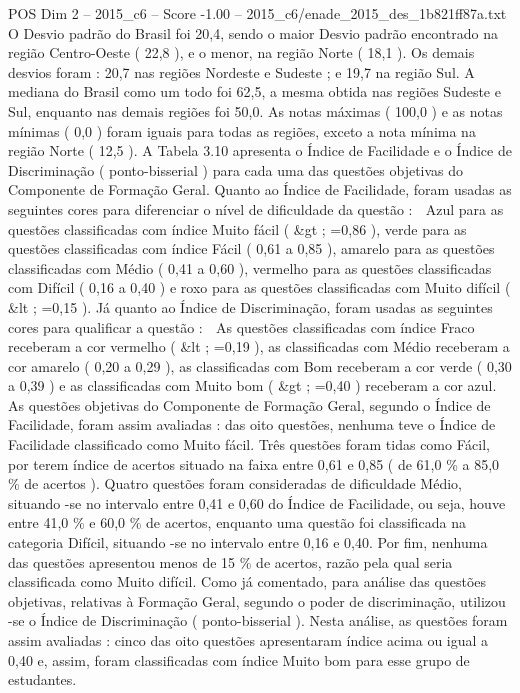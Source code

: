 \begin{textsample}{POS Dim 2 – 2015\_c6 – Score -1.00 – 2015\_c6/enade\_2015\_des\_1b821ff87a.txt}
O Desvio padrão do Brasil foi 20,4, sendo o maior Desvio padrão encontrado na região Centro-Oeste ( 22,8 ), e o menor, na região Norte ( 18,1 ).
Os demais desvios foram : 20,7 nas regiões Nordeste e Sudeste ; e 19,7 na região Sul.
A mediana do Brasil como um todo foi 62,5, a mesma obtida nas regiões Sudeste e Sul, enquanto nas demais regiões foi 50,0.
As notas máximas ( 100,0 ) e as notas mínimas ( 0,0 ) foram iguais para todas as regiões, exceto a nota mínima na região Norte ( 12,5 ).
A Tabela 3.10 apresenta o Índice de Facilidade e o Índice de Discriminação ( ponto-bisserial ) para cada uma das questões objetivas do Componente de Formação Geral.
Quanto ao Índice de Facilidade, foram usadas as seguintes cores para diferenciar o nível de dificuldade da questão :  Azul para as questões classificadas com índice Muito fácil ( \&gt ; =0,86 ), verde para as questões classificadas com índice Fácil ( 0,61 a 0,85 ), amarelo para as questões classificadas com Médio ( 0,41 a 0,60 ), vermelho para as questões classificadas com Difícil ( 0,16 a 0,40 ) e roxo para as questões classificadas com Muito difícil ( \&lt ; =0,15 ).
Já quanto ao Índice de Discriminação, foram usadas as seguintes cores para qualificar a questão :  As questões classificadas com índice Fraco receberam a cor vermelho ( \&lt ; =0,19 ), as classificadas com Médio receberam a cor amarelo ( 0,20 a 0,29 ), as classificadas com Bom receberam a cor verde ( 0,30 a 0,39 ) e as classificadas com Muito bom ( \&gt ; =0,40 ) receberam a cor azul.
As questões objetivas do Componente de Formação Geral, segundo o Índice de Facilidade, foram assim avaliadas : das oito questões, nenhuma teve o Índice de Facilidade classificado como Muito fácil.
Três questões foram tidas como Fácil, por terem índice de acertos situado na faixa entre 0,61 e 0,85 ( de 61,0 \% a 85,0 \% de acertos ).
Quatro questões foram consideradas de dificuldade Médio, situando -se no intervalo entre 0,41 e 0,60 do Índice de Facilidade, ou seja, houve entre 41,0 \% e 60,0 \% de acertos, enquanto uma questão foi classificada na categoria Difícil, situando -se no intervalo entre 0,16 e 0,40.
Por fim, nenhuma das questões apresentou menos de 15 \% de acertos, razão pela qual seria classificada como Muito difícil.
Como já comentado, para análise das questões objetivas, relativas à Formação Geral, segundo o poder de discriminação, utilizou -se o Índice de Discriminação ( ponto-bisserial ).
Nesta análise, as questões foram assim avaliadas : cinco das oito questões apresentaram índice acima ou igual a 0,40 e, assim, foram classificadas com índice Muito bom para esse grupo de estudantes.

\end{textsample}
